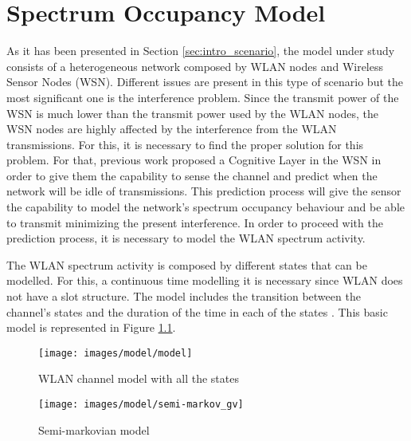 \chapter{Spectrum Occupancy Model} \label{chapter:model}
As it has been presented in Section \ref{sec:intro_scenario}, the model under study consists of a heterogeneous network composed by \acs{WLAN} nodes and Wireless Sensor Nodes (\acs{WSN}). Different issues are present in this type of scenario but the most significant one is the interference problem. Since the transmit power of the \acs{WSN} is much lower than the transmit power used by the \acs{WLAN} nodes, the \acs{WSN} nodes are highly affected by the interference from the \acs{WLAN} transmissions. For this, it is necessary to find the proper solution for this problem. For that, previous work proposed a Cognitive Layer in the \acs{WSN} in order to give them the capability to sense the channel and predict when the network will be idle of transmissions. This prediction process will give the sensor the capability to model the network's spectrum occupancy behaviour and be able to transmit minimizing the present interference. In order to proceed with the prediction process, it is necessary to model the \acs{WLAN} spectrum activity.

The \acs{WLAN} spectrum activity is composed by different states that can be modelled. For this, a continuous time modelling it is necessary since \acs{WLAN} does not have a slot structure. The model includes the transition between the channel's states and the duration of the time in each of the states \cite{marcello-thesis}. This basic model is represented in Figure \ref{fig:WLAN_model}.

\begin{figure}[h]
	\centering
	\texttt{[image: images/model/model]}
	\caption{WLAN channel model with all the states \cite{DSA-Emp}}
	\label{fig:WLAN_model}
\end{figure}

\begin{figure}[h]
	\centering
	\texttt{[image: images/model/semi-markov\_gv]}
	\caption{Semi-markovian model}
	\label{fig:semi-markov}
\end{figure}

